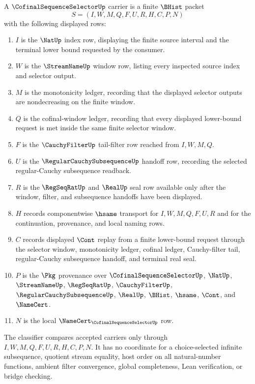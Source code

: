 \begin{definition}
\label{def:cofinal-sequence-selector-carrier}
A $\CofinalSequenceSelectorUp$ carrier is a finite $\BHist$ packet
$$
S=(I,W,M,Q,F,U,R,H,C,P,N)
$$
with the following displayed rows:
\begin{enumerate}
\item $I$ is the $\NatUp$ index row, displaying the finite source interval and the terminal lower bound requested by the consumer.
\item $W$ is the $\StreamNameUp$ window row, listing every inspected source index and selector output.
\item $M$ is the monotonicity ledger, recording that the displayed selector outputs are nondecreasing on the finite window.
\item $Q$ is the cofinal-window ledger, recording that every displayed lower-bound request is met inside the same finite selector window.
\item $F$ is the $\CauchyFilterUp$ tail-filter row reached from $I,W,M,Q$.
\item $U$ is the $\RegularCauchySubsequenceUp$ handoff row, recording the selected regular-Cauchy subsequence readback.
\item $R$ is the $\RegSeqRatUp$ and $\RealUp$ seal row available only after the window, filter, and subsequence handoffs have been displayed.
\item $H$ records componentwise $\hsame$ transport for $I,W,M,Q,F,U,R$ and for the continuation, provenance, and local naming rows.
\item $C$ records displayed $\Cont$ replay from a finite lower-bound request through the selector window, monotonicity ledger, cofinal ledger, Cauchy-filter tail, regular-Cauchy subsequence handoff, and terminal real seal.
\item $P$ is the $\Pkg$ provenance over $\CofinalSequenceSelectorUp$, $\NatUp$, $\StreamNameUp$, $\RegSeqRatUp$, $\CauchyFilterUp$, $\RegularCauchySubsequenceUp$, $\RealUp$, $\BHist$, $\hsame$, $\Cont$, and $\NameCert$.
\item $N$ is the local $\NameCert_{\CofinalSequenceSelectorUp}$ row.
\end{enumerate}
The classifier compares accepted carriers only through $I,W,M,Q,F,U,R,H,C,P,N$. It has no coordinate for a choice-selected infinite subsequence, quotient stream equality, host order on all natural-number functions, ambient filter convergence, global completeness, Lean verification, or bridge checking.
\end{definition}

